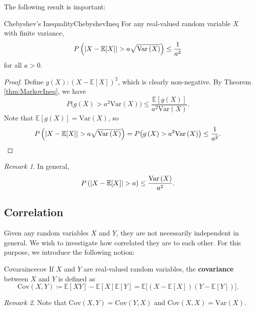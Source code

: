 \documentclass[math, code]{amznotes}
\theoremstyle{remark}
\newtheorem*{remark}{Remark}
\begin{document}
The following result is important:
\begin{thmbox}{Chebyshev's Inequality}{ChebyshevIneq}
    For any real-valued random variable $X$ with finite variance, 
    \begin{equation*}
        P\left({\left\lvert {X - \mathbb{E}[X]} \right\rvert} > a\sqrt{\mathrm{Var}\left(X\right)}\right) \leq \frac{1}{a^2}
    \end{equation*}
    for all $a > 0$.
    \tcblower
    \begin{proof}
        Define $g\left(X\right) \colon \left(X - \mathbb{E}[X]\right)^2$, which is clearly non-negative. By Theorem \ref{thm:MarkovIneq}, we have 
        \begin{equation*}
            P\bigl(g\left(X\right) > a^2\mathrm{Var}\left(X\right)\bigr) \leq \frac{\mathbb{E}[g\left(X\right)]}{a^2\mathrm{Var}\left(X\right)}.
        \end{equation*}
        Note that $\mathbb{E}[g\left(X\right)] = \mathrm{Var}\left(X\right)$, so 
        \begin{equation*}
            P\left({\left\lvert {X - \mathbb{E}[X]} \right\rvert} > a\sqrt{\mathrm{Var}\left(X\right)}\right) = P\bigl(g\left(X\right) > a^2\mathrm{Var}\left(X\right)\bigr) \leq \frac{1}{a^2}.
        \end{equation*}
    \end{proof}
\end{thmbox}
\begin{notebox}
    \begin{remark}
        In general, 
        \begin{equation*}
            P\left({\left\lvert {X - \mathbb{E}[X]} \right\rvert} > a\right) \leq \frac{\mathrm{Var}\left(X\right)}{a^2}.
        \end{equation*}
    \end{remark}
\end{notebox}
\subsection{Correlation}
Given any random variables $X$ and $Y$, they are not necessarily independent in general. We wish to investigate how correlated they are to each other. For this purpose, we introduce the following notion:
\begin{dfnbox}{Covaraince}{cov}
    If $X$ and $Y$ are real-valued random variables, the {\color{red} \textbf{covariance}} between $X$ and $Y$ is defined as
    \begin{equation*}
        \mathrm{Cov}\left(X, Y\right) \coloneqq \mathbb{E}\left[XY\right] - \mathbb{E}\left[X\right]\mathbb{E}\left[Y\right] = \mathbb{E}\bigl[\left(X - \mathbb{E}\left[X\right]\right)\left(Y - \mathbb{E}\left[Y\right]\right)\bigr].
    \end{equation*}
\end{dfnbox}
\begin{notebox}
    \begin{remark}
        Note that $\mathrm{Cov}\left(X, Y\right) = \mathrm{Cov}\left(Y, X\right)$ and $\mathrm{Cov}\left(X, X\right) = \mathrm{Var}\left(X\right)$.
    \end{remark}
\end{notebox}
\end{document}
